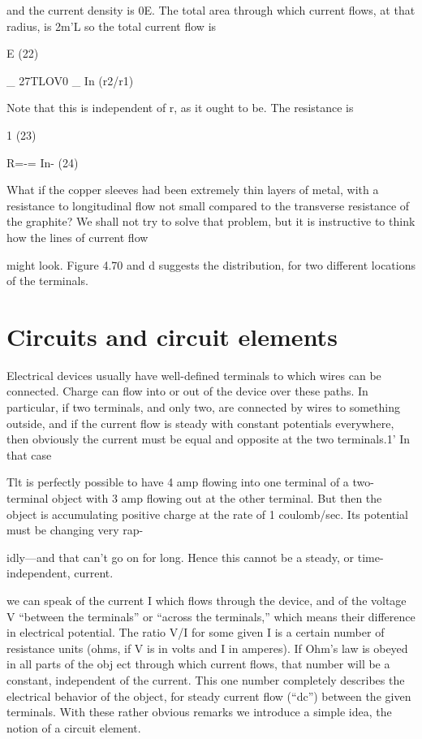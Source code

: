 and the current density is 0E. The total area through which current
flows, at that radius, is 2m'L so the total current flow is

E (22)
\begin{equation}
\end{equation}

_ 27TLOV0
_ In (r2/r1)

Note that this is independent of r, as it ought to be. The resistance
is

1 (23)
\begin{equation}
\end{equation}

R=-= In- (24)
\begin{equation}
\end{equation}

What if the copper sleeves had been extremely thin layers of metal,
with a resistance to longitudinal flow not small compared to the
transverse resistance of the graphite? We shall not try to solve that
problem, but it is instructive to think how the lines of current flow

might look. Figure 4.70 and d suggests the distribution, for two
different locations of the terminals.

\section{Circuits and circuit elements}

Electrical devices usually have well-defined terminals to which
wires can be connected. Charge can flow into or out of the device
over these paths. In particular, if two terminals, and only two, are
connected by wires to something outside, and if the current flow is
steady with constant potentials everywhere, then obviously the current
must be equal and opposite at the two terminals.1' In that case

Tlt is perfectly possible to have 4 amp flowing into one terminal of a two-terminal
object with 3 amp flowing out at the other terminal. But then the object is accumulating
positive charge at the rate of 1 coulomb/sec. Its potential must be changing very rap-

idly---and that can't go on for long. Hence this cannot be a steady, or time-independent,
current.

we can speak of the current I which flows through the device, and of
the voltage V ``between the terminals'' or ``across the terminals,''
which means their difference in electrical potential. The ratio V/I for
some given I is a certain number of resistance units (ohms, if V is in
volts and I in amperes). If Ohm's law is obeyed in all parts of the
obj ect through which current flows, that number will be a constant,
independent of the current. This one number completely describes
the electrical behavior of the object, for steady current flow (``dc'')
between the given terminals. With these rather obvious remarks we
introduce a simple idea, the notion of a circuit element.

